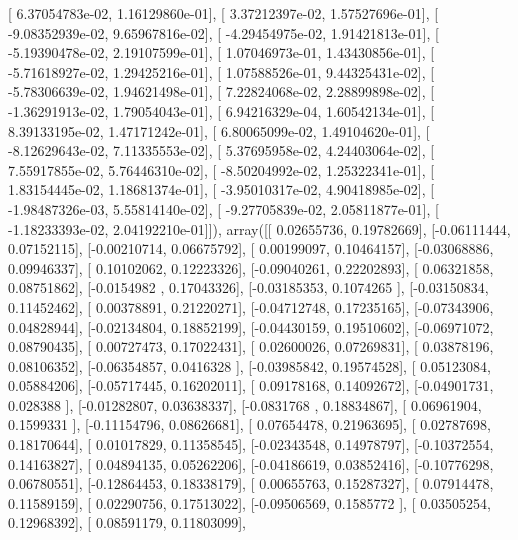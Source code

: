 \documentclass{article}
\begin{document}
       [  6.37054783e-02,   1.16129860e-01],
       [  3.37212397e-02,   1.57527696e-01],
       [ -9.08352939e-02,   9.65967816e-02],
       [ -4.29454975e-02,   1.91421813e-01],
       [ -5.19390478e-02,   2.19107599e-01],
       [  1.07046973e-01,   1.43430856e-01],
       [ -5.71618927e-02,   1.29425216e-01],
       [  1.07588526e-01,   9.44325431e-02],
       [ -5.78306639e-02,   1.94621498e-01],
       [  7.22824068e-02,   2.28899898e-02],
       [ -1.36291913e-02,   1.79054043e-01],
       [  6.94216329e-04,   1.60542134e-01],
       [  8.39133195e-02,   1.47171242e-01],
       [  6.80065099e-02,   1.49104620e-01],
       [ -8.12629643e-02,   7.11335553e-02],
       [  5.37695958e-02,   4.24403064e-02],
       [  7.55917855e-02,   5.76446310e-02],
       [ -8.50204992e-02,   1.25322341e-01],
       [  1.83154445e-02,   1.18681374e-01],
       [ -3.95010317e-02,   4.90418985e-02],
       [ -1.98487326e-03,   5.55814140e-02],
       [ -9.27705839e-02,   2.05811877e-01],
       [ -1.18233393e-02,   2.04192210e-01]]), array([[ 0.02655736,  0.19782669],
       [-0.06111444,  0.07152115],
       [-0.00210714,  0.06675792],
       [ 0.00199097,  0.10464157],
       [-0.03068886,  0.09946337],
       [ 0.10102062,  0.12223326],
       [-0.09040261,  0.22202893],
       [ 0.06321858,  0.08751862],
       [-0.0154982 ,  0.17043326],
       [-0.03185353,  0.1074265 ],
       [-0.03150834,  0.11452462],
       [ 0.00378891,  0.21220271],
       [-0.04712748,  0.17235165],
       [-0.07343906,  0.04828944],
       [-0.02134804,  0.18852199],
       [-0.04430159,  0.19510602],
       [-0.06971072,  0.08790435],
       [ 0.00727473,  0.17022431],
       [ 0.02600026,  0.07269831],
       [ 0.03878196,  0.08106352],
       [-0.06354857,  0.0416328 ],
       [-0.03985842,  0.19574528],
       [ 0.05123084,  0.05884206],
       [-0.05717445,  0.16202011],
       [ 0.09178168,  0.14092672],
       [-0.04901731,  0.028388  ],
       [-0.01282807,  0.03638337],
       [-0.0831768 ,  0.18834867],
       [ 0.06961904,  0.1599331 ],
       [-0.11154796,  0.08626681],
       [ 0.07654478,  0.21963695],
       [ 0.02787698,  0.18170644],
       [ 0.01017829,  0.11358545],
       [-0.02343548,  0.14978797],
       [-0.10372554,  0.14163827],
       [ 0.04894135,  0.05262206],
       [-0.04186619,  0.03852416],
       [-0.10776298,  0.06780551],
       [-0.12864453,  0.18338179],
       [ 0.00655763,  0.15287327],
       [ 0.07914478,  0.11589159],
       [ 0.02290756,  0.17513022],
       [-0.09506569,  0.1585772 ],
       [ 0.03505254,  0.12968392],
       [ 0.08591179,  0.11803099],
\end{document}
